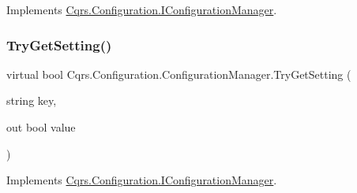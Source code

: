 Implements \hyperlink{interfaceCqrs_1_1Configuration_1_1IConfigurationManager_ac4478405e3d9e1c97d14953aea4e695b_ac4478405e3d9e1c97d14953aea4e695b}{Cqrs.\+Configuration.\+I\+Configuration\+Manager}.

\mbox{\label{classCqrs_1_1Configuration_1_1ConfigurationManager_a40810d0b9fd2f3d1c4a270681e908c84_a40810d0b9fd2f3d1c4a270681e908c84}} 
\subsubsection{\texorpdfstring{Try\+Get\+Setting()}{TryGetSetting()}\hspace{0.1cm}{\footnotesize\ttfamily [2/2]}}
{\footnotesize\ttfamily virtual bool Cqrs.\+Configuration.\+Configuration\+Manager.\+Try\+Get\+Setting (\begin{DoxyParamCaption}\item[{string}]{key,  }\item[{out bool}]{value }\end{DoxyParamCaption})\hspace{0.3cm}{\ttfamily [virtual]}}



Implements \hyperlink{interfaceCqrs_1_1Configuration_1_1IConfigurationManager_a8389181330999fcb8e30af4dbb56d35e_a8389181330999fcb8e30af4dbb56d35e}{Cqrs.\+Configuration.\+I\+Configuration\+Manager}.

